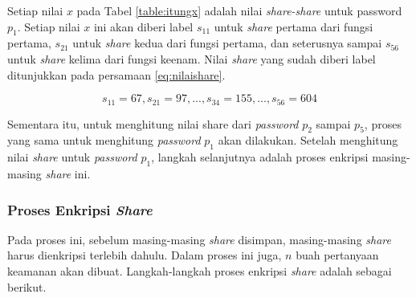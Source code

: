 Setiap nilai \begin{math}x\end{math} pada Tabel \ref{table:itungx} adalah nilai \textit{share-share} untuk password \begin{math}p_1\end{math}. Setiap nilai \begin{math}x\end{math} ini akan diberi label \begin{math}s_{11}\end{math} untuk \textit{share} pertama dari fungsi pertama, \begin{math}s_{21}\end{math} untuk \textit{share} kedua dari fungsi pertama, dan seterusnya sampai \begin{math}s_{56}\end{math} untuk \textit{share} kelima dari fungsi keenam. Nilai \textit{share} yang sudah diberi label ditunjukkan pada persamaan \ref{eq:nilaishare}.

\begin{equation}
	s_{11} = 67, s_{21} = 97, ..., s_{34} = 155, ..., s_{56} = 604 \label{eq:nilaishare}
\end{equation}

Sementara itu, untuk menghitung nilai share dari \textit{password} \begin{math}p_2\end{math} sampai \begin{math}p_5\end{math}, proses yang sama untuk menghitung \textit{password} \begin{math}p_1\end{math} akan dilakukan. Setelah menghitung nilai \textit{share} untuk \textit{password} \begin{math}p_1\end{math}, langkah selanjutnya adalah proses enkripsi masing-masing \textit{share} ini.

\subsubsection{Proses Enkripsi \textit{Share}}

Pada proses ini, sebelum masing-masing \textit{share} disimpan, masing-masing \textit{share} harus dienkripsi terlebih dahulu. Dalam proses ini juga, \begin{math}n\end{math} buah pertanyaan keamanan akan dibuat. Langkah-langkah proses enkripsi \textit{share} adalah sebagai berikut.

